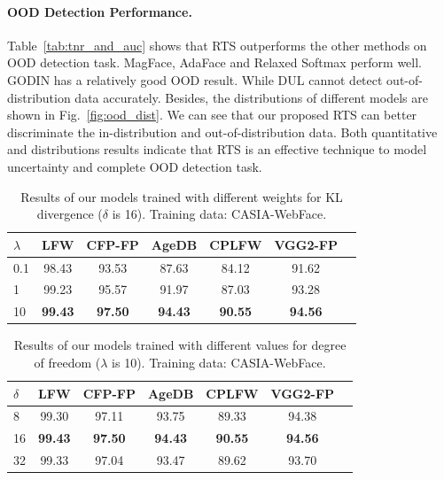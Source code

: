 \documentclass[letterpaper]{article} %
\begin{document}
\paragraph{OOD Detection Performance.}
Table~\ref{tab:tnr_and_auc} shows that RTS outperforms the other methods on OOD detection task. MagFace, AdaFace and Relaxed Softmax perform well. GODIN has a relatively good OOD result. While DUL cannot detect out-of-distribution data accurately. Besides, the distributions of different models are shown in Fig.~\ref{fig:ood_dist}. We can see that our proposed RTS can better discriminate the in-distribution and out-of-distribution data. Both quantitative and distributions results indicate that RTS is an effective technique to model uncertainty and complete OOD detection task.












\begin{table}
\centering
\begin{tabular}{|l|c|c|c|c|c|c|}
\hline
$\lambda$ & LFW & CFP-FP & AgeDB & CPLFW & VGG2-FP \\
\hline\hline
0.1 & 98.43 & 93.53 & 87.63 & 84.12 & 91.62 \\
1 & 99.23 & 95.57 & 91.97 & 87.03 & 93.28 \\
10 & \textbf{99.43} & \textbf{97.50} & \textbf{94.43} & \textbf{90.55} & \textbf{94.56} \\
\hline
\end{tabular}
\caption{Results of our models trained with different weights for KL divergence ($\delta$ is 16). Training data: CASIA-WebFace.}
\label{tab:kl_weight}
\end{table}


\begin{table}
\begin{center}
\begin{tabular}{|l|c|c|c|c|c|c|}
\hline
$\delta$ & LFW & CFP-FP & AgeDB & CPLFW & VGG2-FP \\
\hline\hline
8 & 99.30 & 97.11 & 93.75 & 89.33 & 94.38 \\
16 & \textbf{99.43} & \textbf{97.50} & \textbf{94.43} & \textbf{90.55} & \textbf{94.56} \\
32 & 99.33 & 97.04 & 93.47 & 89.62 & 93.70 \\
\hline
\end{tabular}
\end{center}
\vspace{-1.07mm}
\caption{Results of our models trained with different values for degree of freedom ($\lambda$ is 10). Training data: CASIA-WebFace.}
\label{tab:degree_of_freedom}
\end{table}
\end{document}
